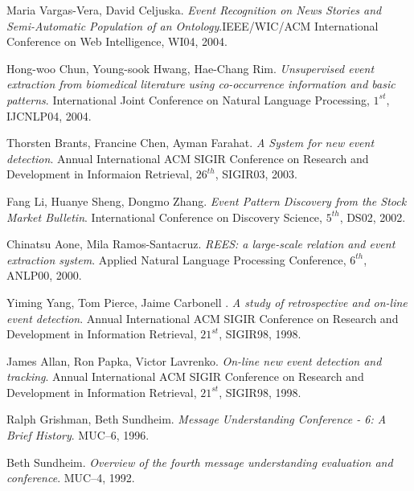 \begin{thebibliography}{99}
		 	Maria Vargas-Vera, David Celjuska. \emph{Event Recognition on News Stories and Semi-Automatic Population of an Ontology}.IEEE/WIC/ACM International Conference on Web Intelligence, WI04, 2004.


		  	Hong-woo Chun, Young-sook Hwang, Hae-Chang Rim. \emph{Unsupervised event extraction from biomedical literature using co-occurrence information and basic patterns}. International Joint Conference on Natural Language Processing, $1^{st}$, IJCNLP04, 2004. 
   
		 Thorsten Brants, Francine Chen, Ayman Farahat. \emph{A System for new event detection}. Annual International ACM SIGIR Conference on Research and Development in Informaion Retrieval, $26^{th}$, SIGIR03, 2003.

		 Fang Li, Huanye Sheng, Dongmo Zhang. \emph{Event Pattern Discovery from the Stock Market Bulletin}. International Conference on Discovery Science, $5^{th}$, DS02, 2002.

		 Chinatsu Aone, Mila Ramos-Santacruz. \emph{REES: a large-scale relation and event extraction system}. Applied Natural Language Processing Conference, $6^{th}$, ANLP00, 2000.

		 	Yiming Yang, Tom Pierce, Jaime Carbonell 	. \emph{A study of retrospective and on-line event detection}.  Annual International ACM SIGIR Conference on Research and Development in Information Retrieval, $21^{st}$, SIGIR98, 1998. 
		
		 James Allan, Ron Papka, Victor Lavrenko. \emph{On-line new event detection and tracking}.  Annual International ACM SIGIR Conference on Research and Development in Information Retrieval, $21^{st}$, SIGIR98, 1998.  	

		 Ralph Grishman, Beth Sundheim. \emph{Message Understanding Conference - 6: A Brief History}. MUC--6, 1996.

		Beth Sundheim. \emph{Overview of the fourth message understanding evaluation and conference}. MUC--4, 1992.
%
	
\end{thebibliography}
